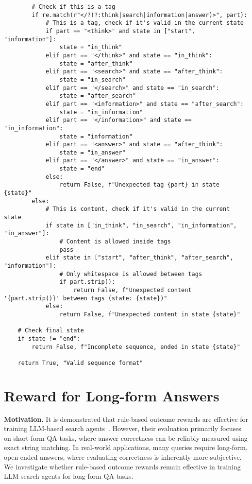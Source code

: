 \begin{lstlisting}
        # Check if this is a tag
        if re.match(r"</?(?:think|search|information|answer)>", part):
            # This is a tag, check if it's valid in the current state
            if part == "<think>" and state in ["start", "information"]:
                state = "in_think"
            elif part == "</think>" and state == "in_think":
                state = "after_think"
            elif part == "<search>" and state == "after_think":
                state = "in_search"
            elif part == "</search>" and state == "in_search":
                state = "after_search"
            elif part == "<information>" and state == "after_search":
                state = "in_information"
            elif part == "</information>" and state == "in_information":
                state = "information"
            elif part == "<answer>" and state == "after_think":
                state = "in_answer"
            elif part == "</answer>" and state == "in_answer":
                state = "end"
            else:
                return False, f"Unexpected tag {part} in state {state}"
        else:
            # This is content, check if it's valid in the current state
            if state in ["in_think", "in_search", "in_information", "in_answer"]:
                # Content is allowed inside tags
                pass
            elif state in ["start", "after_think", "after_search", "information"]:
                # Only whitespace is allowed between tags
                if part.strip():
                    return False, f"Unexpected content '{part.strip()}' between tags (state: {state})"
            else:
                return False, f"Unexpected content in state {state}"
    
    # Check final state
    if state != "end":
        return False, f"Incomplete sequence, ended in state {state}"
        
    return True, "Valid sequence format"

\end{lstlisting}

\section{Reward for Long-form Answers}\label{apx:sec:longform}

\textbf{Motivation.}
It is demonstrated that rule-based outcome rewards are effective for training LLM-based search agents~\citep{jin2025search,zheng2025deepresearcher}.
However, their evaluation primarily focuses on short-form QA tasks, where answer correctness can be reliably measured using exact string matching.
In real-world applications, many queries require long-form, open-ended answers, where evaluating correctness is inherently more subjective.
We investigate whether rule-based outcome rewards remain effective in training LLM search agents for long-form QA tasks.

